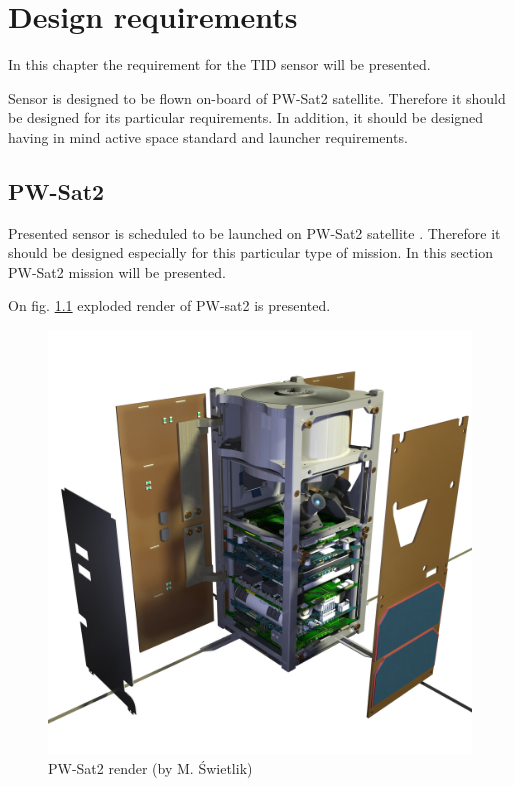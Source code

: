 \chapter{Design requirements}

In this chapter the requirement for the TID sensor will be presented.

Sensor is designed to be flown on-board of PW-Sat2 satellite. Therefore it should be designed for its particular requirements. In addition, it should be designed having in mind active space standard and launcher requirements.


\section{PW-Sat2}
    Presented sensor is scheduled to be launched on PW-Sat2 satellite \cite{PW-Sat2URL}. Therefore it should be designed especially for this particular type of mission. In this section PW-Sat2 mission will be presented.

    On fig. \ref{PW-Sat_render_01} exploded render of PW-sat2 is presented.

    \begin{figure}[h]
        \centering
        \includegraphics[width=0.5\paperwidth]{img/PW-Sat2_render_01.png}
        \caption{PW-Sat2 render (by M. Świetlik)}
        \label{PW-Sat_render_01}
    \end{figure}

